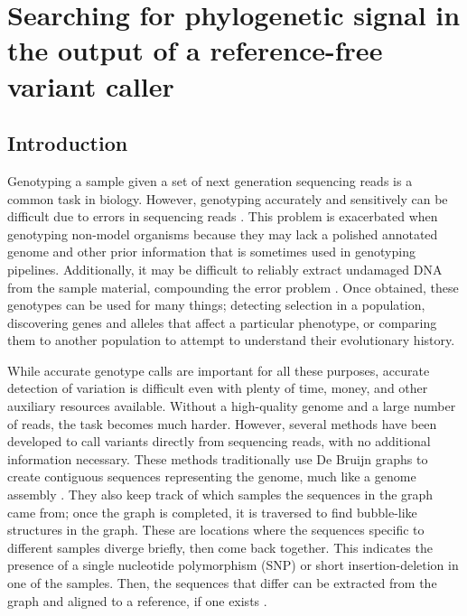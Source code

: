 \chapter{Searching for phylogenetic signal in the output of a reference-free variant caller}
\label{ch:structured}
\newpage
\section{Introduction}

Genotyping a sample given a set of next generation sequencing reads is a common task in biology. However, genotyping accurately and sensitively can be difficult due to errors in sequencing reads \parencite{fox_accuracy_2014, pfeifer_next-generation_2017, wu_estimating_2017}. This problem is exacerbated when genotyping non-model organisms because they may lack a polished annotated genome and other prior information that is sometimes used in genotyping pipelines. Additionally, it may be difficult to reliably extract undamaged DNA from the sample material, compounding the error problem \parencite{da_fonseca_next-generation_2016}. Once obtained, these genotypes can be used for many things; detecting selection in a population, discovering genes and alleles that affect a particular phenotype, or comparing them to another population to attempt to understand their evolutionary history.

While accurate genotype calls are important for all these purposes, accurate detection of variation is difficult even with plenty of time, money, and other auxiliary resources available. Without a high-quality genome and a large number of reads, the task becomes much harder. However, several methods have been developed to call variants directly from sequencing reads, with no additional information necessary. These methods traditionally use De Bruijn graphs to create contiguous sequences representing the genome, much like a genome assembly \parencite{leggett_reference-free_2014}. They also keep track of which samples the sequences in the graph came from; once the graph is completed, it is traversed to find bubble-like structures in the graph. These are locations where the sequences specific to different samples diverge briefly, then come back together. This indicates the presence of a single nucleotide polymorphism (SNP) or short insertion-deletion in one of the samples. Then, the sequences that differ can be extracted from the graph and aligned to a reference, if one exists \parencite{iqbal_novo_2012, uricaru_reference-free_2015}.

